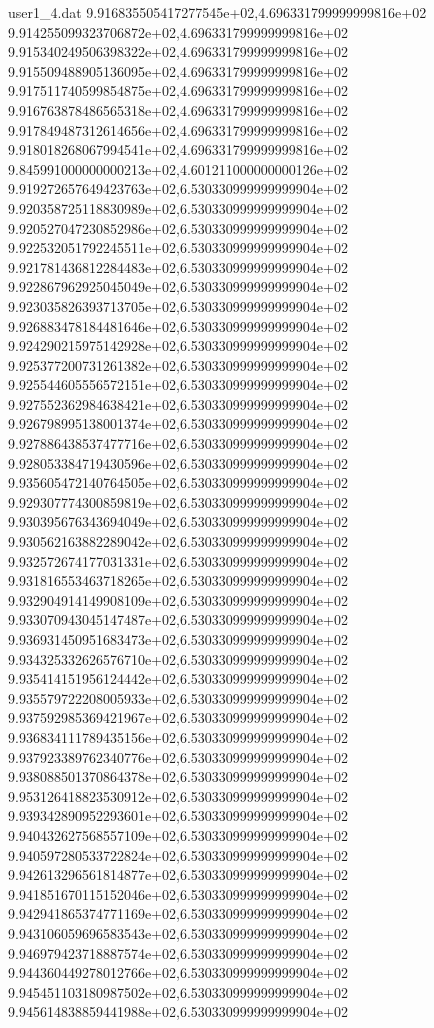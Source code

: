 \begin{filecontents}{user1_4.dat}
9.916835505417277545e+02,4.696331799999999816e+02
9.914255099323706872e+02,4.696331799999999816e+02
9.915340249506398322e+02,4.696331799999999816e+02
9.915509488905136095e+02,4.696331799999999816e+02
9.917511740599854875e+02,4.696331799999999816e+02
9.916763878486565318e+02,4.696331799999999816e+02
9.917849487312614656e+02,4.696331799999999816e+02
9.918018268067994541e+02,4.696331799999999816e+02
9.845991000000000213e+02,4.601211000000000126e+02
9.919272657649423763e+02,6.530330999999999904e+02
9.920358725118830989e+02,6.530330999999999904e+02
9.920527047230852986e+02,6.530330999999999904e+02
9.922532051792245511e+02,6.530330999999999904e+02
9.921781436812284483e+02,6.530330999999999904e+02
9.922867962925045049e+02,6.530330999999999904e+02
9.923035826393713705e+02,6.530330999999999904e+02
9.926883478184481646e+02,6.530330999999999904e+02
9.924290215975142928e+02,6.530330999999999904e+02
9.925377200731261382e+02,6.530330999999999904e+02
9.925544605556572151e+02,6.530330999999999904e+02
9.927552362984638421e+02,6.530330999999999904e+02
9.926798995138001374e+02,6.530330999999999904e+02
9.927886438537477716e+02,6.530330999999999904e+02
9.928053384719430596e+02,6.530330999999999904e+02
9.935605472140764505e+02,6.530330999999999904e+02
9.929307774300859819e+02,6.530330999999999904e+02
9.930395676343694049e+02,6.530330999999999904e+02
9.930562163882289042e+02,6.530330999999999904e+02
9.932572674177031331e+02,6.530330999999999904e+02
9.931816553463718265e+02,6.530330999999999904e+02
9.932904914149908109e+02,6.530330999999999904e+02
9.933070943045147487e+02,6.530330999999999904e+02
9.936931450951683473e+02,6.530330999999999904e+02
9.934325332626576710e+02,6.530330999999999904e+02
9.935414151956124442e+02,6.530330999999999904e+02
9.935579722208005933e+02,6.530330999999999904e+02
9.937592985369421967e+02,6.530330999999999904e+02
9.936834111789435156e+02,6.530330999999999904e+02
9.937923389762340776e+02,6.530330999999999904e+02
9.938088501370864378e+02,6.530330999999999904e+02
9.953126418823530912e+02,6.530330999999999904e+02
9.939342890952293601e+02,6.530330999999999904e+02
9.940432627568557109e+02,6.530330999999999904e+02
9.940597280533722824e+02,6.530330999999999904e+02
9.942613296561814877e+02,6.530330999999999904e+02
9.941851670115152046e+02,6.530330999999999904e+02
9.942941865374771169e+02,6.530330999999999904e+02
9.943106059696583543e+02,6.530330999999999904e+02
9.946979423718887574e+02,6.530330999999999904e+02
9.944360449278012766e+02,6.530330999999999904e+02
9.945451103180987502e+02,6.530330999999999904e+02
9.945614838859441988e+02,6.530330999999999904e+02

\end{filecontents}
